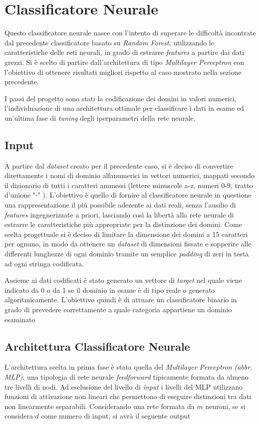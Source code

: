 \section{Classificatore Neurale}
\label{classificatorenn}
Questo classificatore neurale nasce con l'intento di superare le difficoltà incontrate dal precedente classificatore basato su \textit{Random Forest}, utilizzando le caratteristiche delle reti neurali, in grado di estrarre \textit{features} a partire dai dati grezzi. Si è scelto di partire dall'architettura di tipo \textit{Multilayer Perceptron} con l'obiettivo di ottenere risultati migliori rispetto al caso mostrato nella sezione precedente.

I passi del progetto sono stati la codificazione dei domini in valori numerici, l'individuazione di una architettura ottimale per classificare i dati in esame ed un'ultima fase di \textit{tuning} degli iperparametri della rete neurale. 

\subsection{Input}
\label{classificatorenninput}
A partire dal \textit{dataset} creato per il precedente caso, si è deciso di convertire direttamente i nomi di dominio alfanumerici in vettori numerici, mappati secondo il dizionario di tutti i caratteri ammessi \cite{icann} (lettere minuscole a-z, numeri 0-9, tratto d'unione "-" ). L'obiettivo è quello di fornire al classificatore neurale in questione una rappresentazione il più possibile aderente ai dati reali, senza l'ausilio di \textit{features} ingegnerizzate a priori, lasciando così la libertà alla rete neurale di estrarre le caratteristiche più appropriate per la distinzione dei domini. Come scelta progettuale si è deciso di limitare la dimensione dei domini a 15 caratteri per ognuno, in modo da ottenere un \textit{dataset} di dimensioni fissate e sopperire alle differenti lunghezze di ogni dominio tramite un semplice \textit{padding} di zeri in testa ad ogni stringa codificata.

Assieme ai dati codificati è stato generato un vettore di \textit{target} nel quale viene indicato da 0 o da 1 se il dominio in esame è di tipo reale o generato algoritmicamente. L'obiettivo quindi è di attuare un classificatore binario in grado di prevedere correttamente a quale categoria appartiene un dominio esaminato 

\subsection{Architettura Classificatore Neurale}
\label{classificatorenninterno}
L'architettura scelta in prima fase è stata quella del \textit{Multilayer Perceptron} \textit{(abbr. MLP)}, una tipologia di rete neurale \textit{feedforward} tipicamente formata da almeno tre livelli di nodi. Ad esclusione del livello di \textit{input} i livelli del MLP utilizzano  funzioni di attivazione non lineari che permettono di eseguire distinzioni tra dati non linearmente separabili. Considerando una rete formata da $m$ neuroni,  se si considera $d$ come numero di input, si avrà il seguente output

